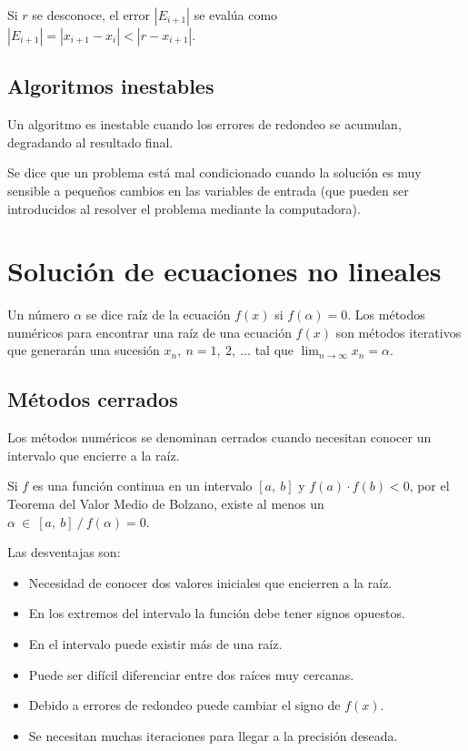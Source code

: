 \documentclass{article}
\begin{document}
Si $r$ se desconoce, el error $|E_{i+1}|$ se evalúa como 
$|E_{i+1}| = |x_{i+1} - x_i| < |r - x_{i+1}|$.

\subsection{Algoritmos inestables}

Un algoritmo es inestable cuando los errores de redondeo se acumulan, degradando
al resultado final.

Se dice que un problema está mal condicionado cuando la solución es muy sensible
a pequeños cambios en las variables de entrada (que pueden ser introducidos al 
resolver el problema mediante la computadora).

\section{Solución de ecuaciones no lineales}

Un número $\alpha$ se dice raíz de la ecuación $f(x)$ si $f(\alpha) = 0$.
Los métodos numéricos para encontrar una raíz de una ecuación $f(x)$ son métodos
iterativos que generarán una sucesión ${x_n},\ n=1,\ 2,\ \dots$ tal que 
$\lim_{n\to\infty} x_n = \alpha$.

\subsection{Métodos cerrados}

Los métodos numéricos se denominan cerrados cuando necesitan conocer un 
intervalo que encierre a la raíz.

Si $f$ es una función continua en un intervalo $[a,\ b]$ y 
$f(a) \cdot f(b) < 0$, por el Teorema del Valor Medio de Bolzano, existe al 
menos un $\alpha\ \in\ [a,\ b]\ /\ f(\alpha)=0$.

Las desventajas son:

\begin{itemize}
    \item Necesidad de conocer dos valores iniciales que encierren a la raíz.
    \item En los extremos del intervalo la función debe tener signos opuestos.
    \item En el intervalo puede existir más de una raíz.
    \item Puede ser difícil diferenciar entre dos raíces muy cercanas.
    \item Debido a errores de redondeo puede cambiar el signo de $f(x)$.
    \item Se necesitan muchas iteraciones para llegar a la precisión deseada.
\end{itemize}
\end{document}
